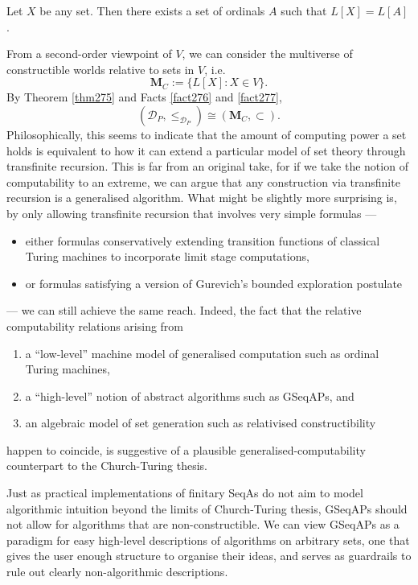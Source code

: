 \documentclass[12pt]{article}
\numberwithin{equation}{section}
\begin{document}
\begin{fact}\label{fact277}
Let $X$ be any set. Then there exists a set of ordinals $A$ such that $L[X] = L[A]$.
\end{fact}

From a second-order viewpoint of $V$, we can consider the multiverse of constructible worlds relative to sets in $V$, i.e.
\begin{equation*}
    \mathbf{M}_C := \{L[X] : X \in V\} \text{.}
\end{equation*}
By Theorem \ref{thm275} and Facts \ref{fact276} and \ref{fact277}, 
\begin{equation*}
    (\mathcal{D}_P, \leq_{\mathcal{D}_P}) \cong (\mathbf{M}_C, \subset) \text{.}
\end{equation*}
Philosophically, this seems to indicate that the amount of computing power a set holds is equivalent to how it can extend a particular model of set theory through transfinite recursion. This is far from an original take, for if we take the notion of computability to an extreme, we can argue that any construction via transfinite recursion is a generalised algorithm. What might be slightly more surprising is, by only allowing transfinite recursion that involves very simple formulas ---
\begin{itemize}
    \item either formulas conservatively extending transition functions of classical Turing machines to incorporate limit stage computations,
    \item or formulas satisfying a version of Gurevich's bounded exploration postulate
\end{itemize}
--- we can still achieve the same reach. Indeed, the fact that the relative computability relations arising from
\begin{enumerate}[label=(GCT\arabic*), leftmargin=50pt]
    \item a ``low-level'' machine model of generalised computation such as ordinal Turing machines, 
    \item a ``high-level'' notion of abstract algorithms such as GSeqAPs, and
    \item an algebraic model of set generation such as relativised constructibility
\end{enumerate}
happen to coincide, is suggestive of a plausible generalised-computability counterpart to the Church-Turing thesis.

Just as practical implementations of finitary SeqAs do not aim to model algorithmic intuition beyond the limits of Church-Turing thesis, GSeqAPs should not allow for algorithms that are non-constructible. We can view GSeqAPs as a paradigm for easy high-level descriptions of algorithms on arbitrary sets, one that gives the user enough structure to organise their ideas, and serves as guardrails to rule out clearly non-algorithmic descriptions.
\end{document}
